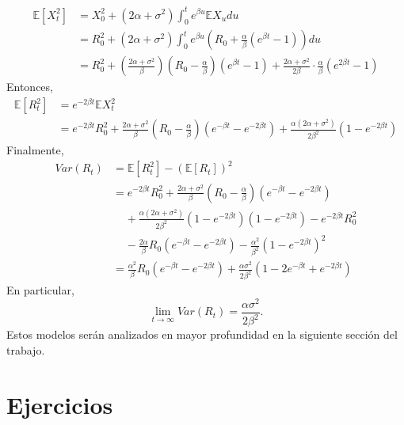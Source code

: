 \documentclass[11pt,notitlepage]{article}
\begin{document}
\begin{align*}
    \mathbb{E}[X_{t}^2]&= X_{0}^{2}+(2 \alpha + \sigma^2)\int_{0}^{t}e^{\beta u} \mathbb{E}X_{u}du \\
    &=R_{0}^{2}+(2 \alpha + \sigma^2)\int_{0}^{t}e^{\beta u}(R_0+\frac{\alpha}{\beta} (e^{\beta t}-1))du\\
    &=R_{0}^{2}+\left ( \frac{2 \alpha + \sigma^2}{\beta} \right )\left ( R_0-\frac{\alpha}{\beta} \right )\left ( e^{\beta t}-1 \right )+\frac{2 \alpha + \sigma^2}{2 \beta} \cdot \frac{\alpha}{\beta}(e^{2 \beta t}-1) 
\end{align*}
Entonces,
\begin{align*}
    \mathbb{E}[R_{t}^2]&=e^{-2\beta t}\mathbb{E}X_{t}^{2}\\
    &=e^{-2\beta t}R_{0}^{2}+\frac{2 \alpha + \sigma^2}{\beta}(R_{0}-\frac{\alpha}{\beta})(e^{-\beta t}-e^{-2\beta t})+\frac{ \alpha(2 \alpha + \sigma^2)}{2 \beta^2}(1-e^{-2\beta t})
\end{align*}
Finalmente,
\begin{align*}
    Var(R_t)&=\mathbb{E}[R_{t}^{2}]-(\mathbb{E}[R_t])^2 \\
    &=e^{-2\beta t}R_{0}^{2}+\frac{2 \alpha + \sigma^2}{\beta}\left ( R_{0}-\frac{\alpha}{\beta} \right )\left ( e^{-\beta t}-e^{-2\beta t} \right )\\
    &\ \ \ \ \ +\frac{ \alpha(2 \alpha + \sigma^2)}{2 \beta^2}\left ( 1-e^{-2\beta t} \right )\left ( 1- e^{-2\beta t} \right )-e^{-2\beta t}R_{0}^{2}\\
    &\ \ \ \ \ -\frac{2 \alpha}{\beta}R_0\left ( e^{-\beta t}-e^{-2\beta t} \right )-\frac{\alpha^2}{\beta^2}\left ( 1-e^{-2\beta t} \right )^2\\
    &= \frac{\alpha^2}{\beta}R_{0}\left ( e^{-\beta t}-e^{-2\beta t} \right )+ \frac{\alpha \sigma^2}{2\beta^2}\left ( 1-2e^{-\beta t}+e^{-2\beta t} \right )
\end{align*}
En particular,
\begin{equation*}
    \lim_{t \rightarrow\infty} Var(R_{t})= \frac{\alpha \sigma^2}{2\beta^2}.
\end{equation*}
Estos modelos serán analizados en mayor profundidad en la siguiente sección del trabajo. 

\part{Ejercicios} 
\end{document}
